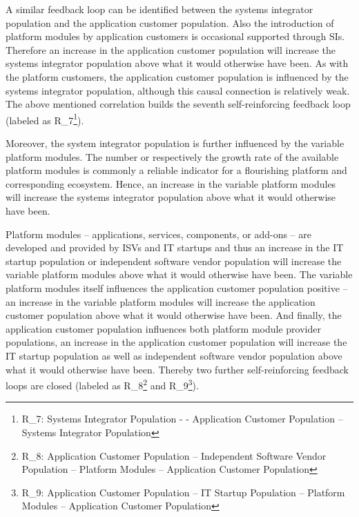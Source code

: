 A similar feedback loop can be identified between the systems integrator population and the application customer population. Also the introduction of platform modules by application customers is occasional supported through \acp{SI}. Therefore an increase in the application customer population will increase the systems integrator population above what it would otherwise have been. As with the platform customers, the application customer population is influenced by the systems integrator population, although this causal connection is relatively weak. The above mentioned correlation builds the seventh self-reinforcing feedback loop (labeled as R\_7\footnote{R\_7: Systems Integrator Population - - Application Customer Population -- Systems Integrator Population}).

Moreover, the system integrator population is further influenced by the variable platform modules. The number or respectively the growth rate of the available platform modules is commonly a reliable indicator for a flourishing platform and corresponding ecosystem. Hence, an increase in the variable platform modules will increase the systems integrator population above what it would otherwise have been.

Platform modules -- applications, services, components, or add-ons -- are developed and provided by \acp{ISV} and \ac{IT} startups and thus an increase in the \ac{IT} startup population or independent software vendor population will increase the variable platform modules above what it would otherwise have been. The variable platform modules itself influences the application customer population positive -- an increase in the variable platform modules will increase the application customer population above what it would otherwise have been. And finally, the application customer population influences both platform module provider populations, an increase in the application customer population will increase the \ac{IT} startup population as well as independent software vendor population above what it would otherwise have been. Thereby two further self-reinforcing feedback loops are closed (labeled as R\_8\footnote{R\_8: Application Customer Population -- Independent Software Vendor Population -- Platform Modules -- Application Customer Population} and R\_9\footnote{R\_9: Application Customer Population -- \ac{IT} Startup Population -- Platform Modules -- Application Customer Population}).

